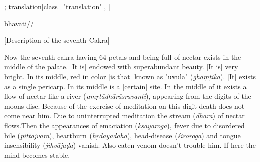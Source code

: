 \documentclass[12pt]{article}%
\begin{document}
\begin{alignment}[
    texts=edition[class="edition"];
    translation[class="translation"],
  ]
\begin{edition}
\begin{prose}
{           }
         bhavati//         
    \end{prose}
\end{edition}
\begin{translation}
    \bigskip
    \centerline{\textrm{\small{[Description of the seventh Cakra]}}}
    \bigskip
  \begin{tlate}
    Now the seventh cakra having 64 petals and being full of nectar exists in the middle of the palate.    
%
%
%
[It is] endowed with superabundant beauty. [It is] very bright. In its middle, red in color [is that] known as "uvula" (\textit{ghāṃṭikā}). [It] exists as a single pericarp. In its middle is a [certain] site. In the middle of it exists a flow of nectar like a river (\textit{amṛtādhārāsravantī}), appearing from the digits of the moons disc. Because of the exercise of meditation on this digit death does not come near him. Due to uninterrupted meditation the stream (\textit{dhārā}) of nectar flows.Then the appearances of emaciation (\textit{kṣayaroga}), fever due to disordered bile (\textit{pittajvara}), heartburn (\textit{hṛdayadāha}), head-disease (\textit{śiroroga}) and tongue insensibility (\textit{jihvājaḍa}) vanish. Also eaten venom doesn't trouble him. If here the mind becomes stable.     
  \end{tlate}
\end{translation}
\end{alignment}
\end{document}
